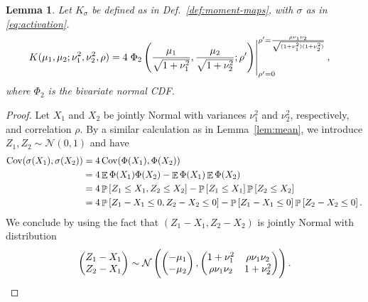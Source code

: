 \documentclass[oneside, article]{memoir}
\newtheorem{lemma}{Lemma}
\DeclareMathOperator{\expect}{\mathbb{E}}
\DeclareMathOperator{\probability}{\mathbb{P}}
\DeclareMathOperator{\Cov}{\operatorname{Cov}}
\begin{document}
\begin{lemma}
  Let \(K_\sigma\) be defined as in Def.~\ref{def:moment-maps}, with
  \(\sigma\) as in \eqref{eq:activation}.
  \begin{align*}
    K(\mu_1, \mu_2; \nu_1^2, \nu_2^2, \rho) &=
    4 \left.
    \Phi_2\del{
      \frac{\mu_1}{\sqrt{1 + \nu_1^2}},
      \frac{\mu_2}{\sqrt{1 + \nu_2^2}};
      \rho'
    }
    \right|^{\rho' = \frac{\rho \nu_1 \nu_2}{\sqrt{(1 +
    \nu_1^2)(1 + \nu_2^2)}}}_{\rho' = 0},
  \end{align*}
  where \(\Phi_2\) is the bivariate normal CDF.
\end{lemma}
\begin{proof}
  Let \(X_1\) and \(X_2\) be jointly Normal with variances
  \(\nu_1^2\) and \(\nu_2^2\), respectively, and correlation \(\rho\).
  By a similar calculation as in Lemma~\ref{lem:mean}, we introduce
  \(Z_1, Z_2 \sim \mathcal N(0, 1)\) and have
  \begin{align}
    \Cov (\sigma(X_1), \sigma(X_2))
    &= 4 \Cov (\Phi(X_1), \Phi(X_2))
    \\
    &= 4\expect \Phi(X_1) \Phi (X_2) - \expect \Phi(X_1) \expect \Phi(X_2)
    \\
    &= 4 \probability\sbr{Z_1 \leq X_1, Z_2 \leq X_2} -
    \probability\sbr{Z_1 \leq X_1} \probability\sbr{Z_2 \leq X_2}
    \\
    &= 4 \probability\sbr{Z_1 - X_1 \leq 0, Z_2 - X_2 \leq 0} -
    \probability\sbr{Z_1- X_1\leq 0} \probability\sbr{Z_2 - X_2 \leq 0}.
  \end{align}
  We conclude by using the fact that \((Z_1 - X_1, Z_2 - X_2)\) is
  jointly Normal with distribution
  \begin{align}
    \begin{pmatrix}
      Z_1 - X_1
      \\
      Z_2 - X_1
    \end{pmatrix}
    \sim
    \mathcal{N}\del{
      \begin{pmatrix}
        -\mu_1
        \\
        -\mu_2
      \end{pmatrix},
      \begin{pmatrix}
        1 + \nu_1^2
        &
        \rho \nu_1 \nu_2
        \\
        \rho \nu_1 \nu_2
        &
        1 + \nu_2^2
      \end{pmatrix}
    }.
  \end{align}
\end{proof}
\end{document}
